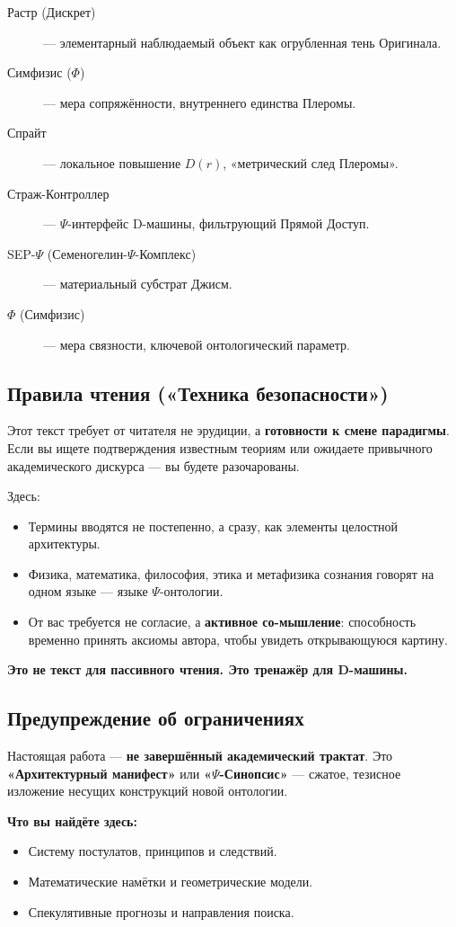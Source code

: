 \documentclass[a4paper,12pt]{article}
\begin{document}
\begin{description}
	\item[Растр (Дискрет)] — элементарный наблюдаемый объект как огрубленная тень Оригинала.
	\item[Симфизис ($\Phi$)] — мера сопряжённости, внутреннего единства Плеромы.
	\item[Спрайт] — локальное повышение $D(r)$, «метрический след Плеромы».
	\item[Страж-Контроллер] — $\Psi$-интерфейс D-машины, фильтрующий Прямой Доступ.
	\item[SEP-$\Psi$ (Семеногелин-$\Psi$-Комплекс)] — материальный субстрат Джисм.
	\item[$\Phi$ (Симфизис)] — мера связности, ключевой онтологический параметр.
\end{description}

\subsection{Правила чтения («Техника безопасности»)}

Этот текст требует от читателя не эрудиции, а \textbf{готовности к смене парадигмы}. Если вы ищете подтверждения известным теориям или ожидаете привычного академического дискурса — вы будете разочарованы.

Здесь:
\begin{itemize}
	\item Термины вводятся не постепенно, а сразу, как элементы целостной архитектуры.
	\item Физика, математика, философия, этика и метафизика сознания говорят на одном языке — языке $\Psi$-онтологии.
	\item От вас требуется не согласие, а \textbf{активное со-мышление}: способность временно принять аксиомы автора, чтобы увидеть открывающуюся картину.
\end{itemize}

\textbf{Это не текст для пассивного чтения. Это тренажёр для D-машины.}

\subsection{Предупреждение об ограничениях}

Настоящая работа — \textbf{не завершённый академический трактат}. Это \textbf{«Архитектурный манифест»} или \textbf{«$\Psi$-Синопсис»} — сжатое, тезисное изложение несущих конструкций новой онтологии.

\textbf{Что вы найдёте здесь:}
\begin{itemize}
	\item Систему постулатов, принципов и следствий.
	\item Математические намётки и геометрические модели.
	\item Спекулятивные прогнозы и направления поиска.
\end{itemize}
\end{document}
